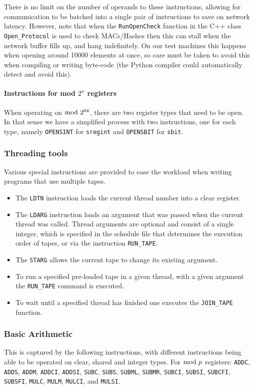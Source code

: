 There is no limit on the number of operands to these instructions,
allowing for communication to be batched into a single pair of
instructions to save on network latency. However, note that when
the \texttt{RunOpenCheck} function in the C++ class \texttt{Open\_Protocol}
is used to check MACs/Hashes then this can stall when the network buffer fills
up, and hang indefinitely.
On our test machines this happens when opening around 10000 elements
at once, so care must be taken to avoid this when compiling or writing
byte-code (the Python compiler could automatically detect and avoid
this).

\paragraph{Instructions for mod $2^n$ registers}
When operating on $\bmod \; 2^{64}$, there are two register types that need to be open.
In that sense we have a simplified process with two instructions, one for each type,
namely \verb+OPENSINT+ for \verb+sregint+ and \verb+OPENSBIT+ for \verb|sbit|.

\subsubsection{Threading tools}
Various special instructions are provided to ease the workload when writing
programs that use multiple tapes.
\begin{itemize}
\item The \verb+LDTN+ instruction loads the current thread number into
a clear register.
\item The \verb+LDARG+ instruction loads an argument that was passed
when the current thread was called.
Thread arguments are optional and consist of a single integer,
which is specified in the schedule file that determines the execution
order of tapes, or via the instruction \verb+RUN_TAPE+.
\item The \verb+STARG+ allows the current tape to change its
existing argument.
\item To run a specified pre-loaded tape in a given thread, with
a given argument the \verb+RUN_TAPE+ command is executed.
\item To wait until a specified thread has finished one executes
the \verb+JOIN_TAPE+ function.
\end{itemize}

\subsubsection{Basic Arithmetic}
This is captured by the following instructions,
with different instructions being able to be operated
on clear, shared and integer types.
For $\bmod \; p$ registers:
    \verb+ADDC+,
    \verb+ADDS+,
    \verb+ADDM+,
    \verb+ADDCI+,
    \verb+ADDSI+,
    \verb+SUBC+,
    \verb+SUBS+,
    \verb+SUBML+,
    \verb+SUBMR+,
    \verb+SUBCI+,
    \verb+SUBSI+,
    \verb+SUBCFI+,
    \verb+SUBSFI+,
    \verb+MULC+,
    \verb+MULM+,
    \verb+MULCI+,
    and
    \verb+MULSI+.


